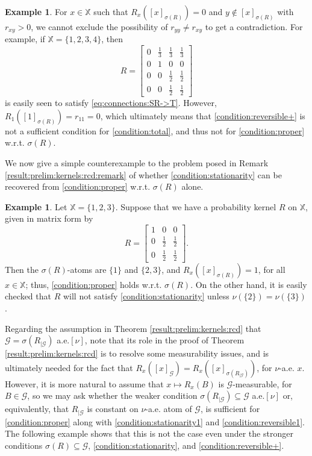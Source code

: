 \documentclass[a4paper]{article}
\theoremstyle{plain}
\theoremstyle{remark}
\theoremstyle{definition}
\newtheorem{example}[theorem]{Example}
\begin{document}
\begin{example}
For $x\in\mathbb{X}$ such that $R_x([x]_{\sigma(R)})=0$ and $y\notin[x]_{\sigma(R)}$ with $r_{xy}>0$, we cannot exclude the possibility of $r_{yy}\neq r_{xy}$ to get a contradiction. For example, if $\mathbb{X}=\{1,2,3,4\}$, then
\[R=\left[\begin{array}{cccc} 0 & \frac{1}{3} & \frac{1}{3} & \frac{1}{3} \\ 0 & 1 & 0 & 0 \\ 0 & 0 & \frac{1}{2} & \frac{1}{2} \\ 0 & 0 & \frac{1}{2} & \frac{1}{2} \end{array}\right]\]
is easily seen to satisfy \eqref{eq:connections:SR->T}. However, $R_1([1]_{\sigma(R)})=r_{11}=0$, which ultimately means that \eqref{condition:reversible+} is not a sufficient condition for \eqref{condition:total}, and thus not for \eqref{condition:proper} w.r.t. $\sigma(R)$.
\end{example}

We now give a simple counterexample to the problem posed in Remark \ref{result:prelim:kernels:rcd:remark} of whether \eqref{condition:stationarity} can be recovered from \eqref{condition:proper} w.r.t. $\sigma(R)$ alone.

\begin{example}\label{example:connections:three_colors}
Let $\mathbb{X}=\{1,2,3\}$. Suppose that we have a probability kernel $R$ on $\mathbb{X}$, given in matrix form by
\[R=\left[\begin{array}{ccc} 1 & 0 & 0 \\ 0 & \frac{1}{2} & \frac{1}{2} \\ 0 & \frac{1}{2} & \frac{1}{2} \end{array}\right].\]
Then the $\sigma(R)$-atoms are $\{1\}$ and $\{2,3\}$, and $R_x([x]_{\sigma(R)})=1$, for all $x\in\mathbb{X}$; thus, \eqref{condition:proper} holds w.r.t. $\sigma(R)$. On the other hand, it is easily checked that $R$ will not satisfy \eqref{condition:stationarity} unless $\nu(\{2\})=\nu(\{3\})$.
\end{example}

Regarding the assumption in Theorem \ref{result:prelim:kernels:rcd} that $\mathcal{G}=\sigma(R_{|\mathcal{G}})$ a.e.$[\nu]$, note that its role in the proof of Theorem \ref{result:prelim:kernels:rcd} is to resolve some measurability issues, and is ultimately needed for the fact that $R_x([x]_\mathcal{G})=R_x([x]_{\sigma(R_{|\mathcal{G}})})$, for $\nu$-a.e. $x$. However, it is more natural to assume that $x\mapsto R_x(B)$ is $\mathcal{G}$-measurable, for $B\in\mathcal{G}$, so we may ask whether the weaker condition $\sigma(R_{|\mathcal{G}})\subseteq\mathcal{G}$ a.e.$[\nu]$ or, equivalently, that $R_{|\mathcal{G}}$ is constant on $\nu$-a.e. atom of $\mathcal{G}$, is sufficient for \eqref{condition:proper} along with \eqref{condition:stationarity1} and \eqref{condition:reversible1}. The following example shows that this is not the case even under the stronger conditions $\sigma(R)\subseteq\mathcal{G}$, \eqref{condition:stationarity}, and \eqref{condition:reversible+}. 
\end{document}
